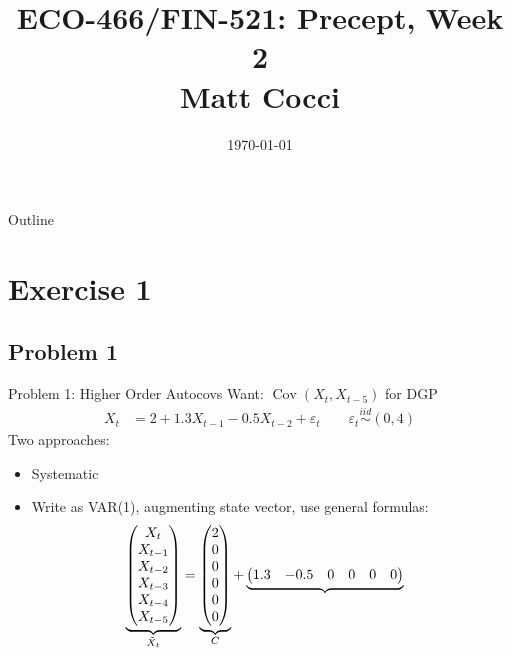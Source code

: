 \documentclass[handout]{beamer}
\title[]{ECO-466/FIN-521: Precept, Week 2 \\ Matt Cocci}
\author[]{}
\date{\today}
\newcommand{\iid}{\overset{iid}{\sim}}
\newcommand{\Cov}{\operatorname{Cov}}
\begin{document}
\begin{frame}[plain]
\titlepage
\end{frame}


\begin{frame}{Outline}
\tableofcontents[hideallsubsections]
\end{frame}


\section{Exercise 1}

\subsection{Problem 1}

\begin{frame}[shrink]{Problem 1: Higher Order Autocovs}
\alert{Want}:
$\Cov(X_t,X_{t-5})$
for DGP
\begin{align*}
  X_t
  &=
  2 + 1.3 X_{t-1} - 0.5 X_{t-2} + \varepsilon_t
  \qquad
  \varepsilon_t \iid (0,4)
\end{align*}
Two approaches:
\begin{itemize}
  \item Systematic
  \item
    Write as VAR(1), augmenting state vector, use general formulas:
    \begin{align*}
      \underbrace{%
        \begin{pmatrix}
          X_t \\
          X_{t-1} \\
          X_{t-2} \\
          X_{t-3} \\
          X_{t-4} \\
          X_{t-5}
        \end{pmatrix}
      }_{\tilde{X}_{t}}
      &=
      \underbrace{%
        \begin{pmatrix}
          2 \\
          0 \\
          0 \\
          0 \\
          0 \\
          0 \\
        \end{pmatrix}
      }_{C}
      +
      \underbrace{%
        \begin{pmatrix}
          1.3 & -0.5 & 0 & 0 & 0 & 0 \\

\end{pmatrix}}
\end{align*}
\end{itemize}
\end{frame}
\end{document}
